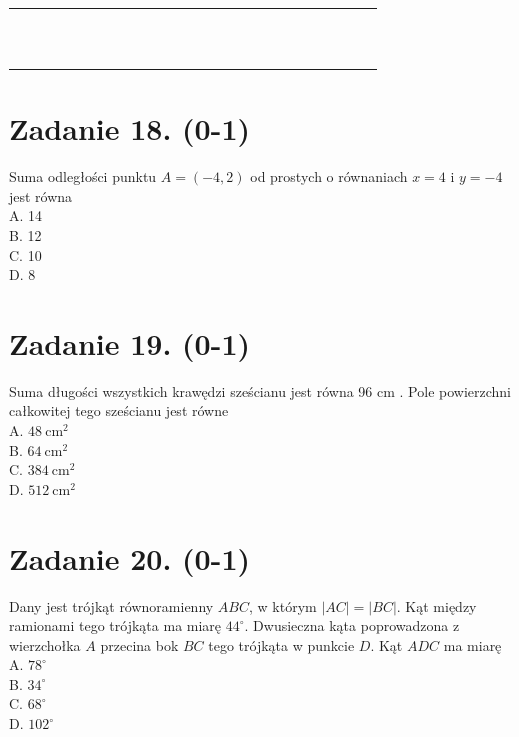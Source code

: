 \documentclass[10pt]{article}
\begin{document}
\begin{center}
\begin{tabular}{|c|c|c|c|c|c|c|c|c|c|c|c|c|c|c|c|c|c|c|c|c|c|c|}
\hline
 &  &  &  &  &  &  &  &  &  &  &  &  &  &  &  &  &  &  &  &  &  &  \\
\hline
 &  &  &  &  &  &  &  &  &  &  &  &  &  &  &  &  &  &  &  &  &  &  \\
\hline
 &  &  &  &  &  &  &  &  &  &  &  &  &  &  &  &  &  &  &  &  &  &  \\
\hline
 &  &  &  &  &  &  &  &  &  &  &  &  &  &  &  &  &  &  &  &  &  &  \\
\hline
 &  &  &  &  &  &  &  &  &  &  &  &  &  &  &  &  &  &  &  &  &  &  \\
\hline
 &  &  &  &  &  &  &  &  &  &  &  &  &  &  &  &  &  &  &  &  &  &  \\
\hline
 &  &  &  &  &  &  &  &  &  &  &  &  &  &  &  &  &  &  &  &  &  &  \\
\hline
 &  &  &  &  &  &  &  &  &  &  &  &  &  &  &  &  &  &  &  &  &  &  \\
\hline
 &  &  &  &  &  &  &  &  &  &  &  &  &  &  &  &  &  &  &  &  &  &  \\
\hline
 &  &  &  &  &  &  &  &  &  &  &  &  &  &  &  &  &  &  &  &  &  &  \\
\hline
 &  &  &  &  &  &  &  &  &  &  &  &  &  &  &  &  &  &  &  &  &  &  \\
\hline
\end{tabular}
\end{center}

\section*{Zadanie 18. (0-1)}
Suma odległości punktu \(A=(-4,2)\) od prostych o równaniach \(x=4\) i \(y=-4\) jest równa\\
A. 14\\
B. 12\\
C. 10\\
D. 8

\section*{Zadanie 19. (0-1)}
Suma długości wszystkich krawędzi sześcianu jest równa 96 cm . Pole powierzchni całkowitej tego sześcianu jest równe\\
A. \(48 \mathrm{~cm}^{2}\)\\
B. \(64 \mathrm{~cm}^{2}\)\\
C. \(384 \mathrm{~cm}^{2}\)\\
D. \(512 \mathrm{~cm}^{2}\)

\section*{Zadanie 20. (0-1)}
Dany jest trójkąt równoramienny \(A B C\), w którym \(|A C|=|B C|\). Kąt między ramionami tego trójkąta ma miarę \(44^{\circ}\). Dwusieczna kąta poprowadzona z wierzchołka \(A\) przecina bok \(B C\) tego trójkąta w punkcie \(D\). Kąt \(A D C\) ma miarę\\
A. \(78^{\circ}\)\\
B. \(34^{\circ}\)\\
C. \(68^{\circ}\)\\
D. \(102^{\circ}\)
\end{document}
